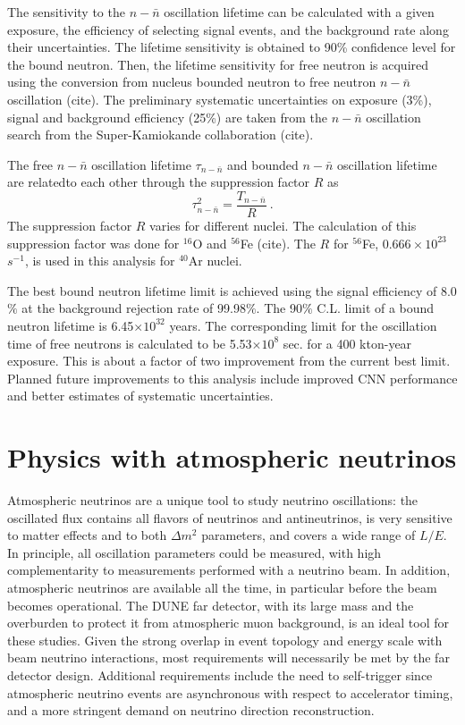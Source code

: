 The sensitivity to the $n-\bar{n}$ oscillation lifetime can be calculated with a given exposure, the efficiency of selecting signal events, and the background rate along their uncertainties. The lifetime sensitivity is obtained to 90\% confidence level for the bound neutron. Then, the lifetime sensitivity for free neutron is acquired using the conversion from nucleus bounded neutron to free neutron $n-\bar{n}$ oscillation (cite).  The preliminary systematic uncertainties on exposure (3\%), signal and background efficiency (25\%) are taken from the $n-\bar{n}$ oscillation search from the Super-Kamiokande collaboration (cite).

The free $n-\bar{n}$ oscillation lifetime $\tau_{n-\bar{n}}$ and bounded $n-\bar{n}$ oscillation lifetime are relatedto each other through the suppression factor $R$ as
\begin{equation}
    \tau^{2}_{n-\bar{n}} = \frac{T_{n-\bar{n}}}{R} ~.
    \label{eq:tau}
\end{equation}
The suppression factor $R$ varies for different nuclei. The calculation of this suppression factor was done for $^{16}$O and $^{56}$Fe (cite). The $R$ for $^{56}$Fe, $0.666\times10^{23}$ $s^{-1}$, is used in this analysis for $^{40}$Ar nuclei.

The best bound neutron lifetime limit is achieved using the signal efficiency of 8.0$\%$ at the background rejection rate of 99.98$\%$. The 90$\%$ C.L. limit of a bound neutron lifetime is 6.45$\times 10^{32}$ years. The corresponding  limit for the oscillation time of free neutrons is calculated to be 5.53$\times 10^{8}$ sec. for a 400 kton-year exposure. This is about a factor of two improvement from the current best limit\cite{intranuclear}.  Planned future improvements to this analysis include improved CNN performance and better estimates of systematic uncertainties.

\section{Physics with atmospheric neutrinos}
\label{sec:nonaccel-atm}

Atmospheric neutrinos are a unique tool to study neutrino oscillations: the oscillated flux contains all flavors of neutrinos and antineutrinos, is very sensitive to matter effects and to both $\Delta m^2$ parameters, and covers a wide range of $L/E$. In principle, all oscillation parameters could be measured, with high
complementarity to measurements performed with a neutrino beam. In addition, atmospheric neutrinos are available all the time, in particular before the beam becomes operational. The DUNE far detector, with its large mass and the overburden to protect it from atmospheric muon background, is an ideal tool for these studies.  Given the strong overlap in event topology and energy scale with beam neutrino interactions, most requirements will necessarily be met by the far detector design. Additional requirements include the need to self-trigger since atmospheric neutrino events are asynchronous with respect to accelerator timing, and a more stringent demand on neutrino direction reconstruction.

